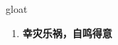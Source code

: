 
\begin{frame}
{\huge gloat}
\begin{center}
\begin{enumerate}\Large
  \item \textbf{幸灾乐祸，自鸣得意}
\end{enumerate}
\end{center}
\end{frame}
